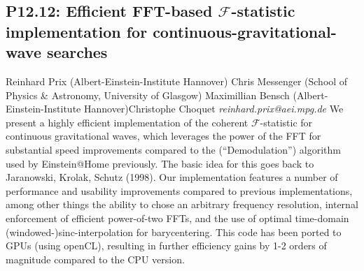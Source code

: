 \documentclass{report}
\begin{document}
\subsection*{P12.12: Efficient FFT-based $\mathcal{F}$-statistic implementation for continuous-gravitational-wave searches}
\bigskip
Reinhard Prix (Albert-Einstein-Institute Hannover) \newline Chris Messenger (School of Physics \& Astronomy, University of Glasgow) \newline  Maximillian Bensch (Albert-Einstein-Institute Hannover)\newline  Christophe Choquet \newline  \newline  \newline\newline
{\it reinhard.prix@aei.mpg.de}\newline
\newline\newline
We present a highly efficient implementation of the coherent
$\mathcal{F}$-statistic for continuous gravitational waves, which
leverages the power of the FFT for substantial speed improvements
compared to the (``Demodulation'') algorithm used by Einstein@Home
previously.
The basic idea for this goes back to Jaranowski, Krolak, Schutz (1998).
Our implementation features a number of performance and usability
improvements compared to previous implementations, among other things
the ability to chose an arbitrary frequency resolution, internal
enforcement of efficient power-of-two FFTs, and the use of optimal
time-domain (windowed-)sinc-interpolation for barycentering.
This code has been ported to GPUs (using openCL), resulting in further
efficiency gains by 1-2 orders of magnitude compared to the CPU version.\newline
\newpage
\end{document}
